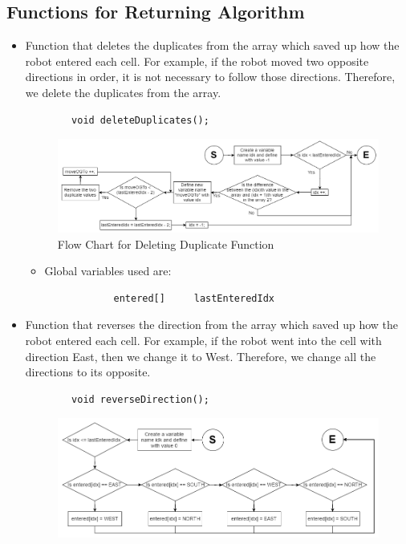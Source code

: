 \documentclass[11pt]{article}
\begin{document}

\subsection{Functions for Returning Algorithm}
\begin{itemize}
\item Function that deletes the duplicates from the array which saved up how the robot entered each cell. For example, if the robot moved two opposite directions in order, it is not necessary to follow those directions. Therefore, we delete the duplicates from the array.
 	\begin{verbatim}
		void deleteDuplicates();
	\end{verbatim}
\begin{figure}[htp]
\centering
\includegraphics[scale=0.50]{images/Software_Flowchart/deleteDuplicate.png}
\caption{Flow Chart for Deleting Duplicate Function}
\label{}
\end{figure}
	\begin{itemize}
	\item Global variables used are:
 		\begin{verbatim}
			entered[]     lastEnteredIdx
		\end{verbatim}
	\end{itemize}
\item Function that reverses the direction from the array which saved up how the robot entered each cell. For example, if the robot went into the cell with direction East, then we change it to West. Therefore, we change all the directions to its opposite.
 	\begin{verbatim}
		void reverseDirection();
	\end{verbatim}
\begin{figure}[htp]
\centering
\includegraphics[scale=0.50]{images/Software_Flowchart/reverseDirection.png}

\end{figure}
\end{itemize}
\end{document}
